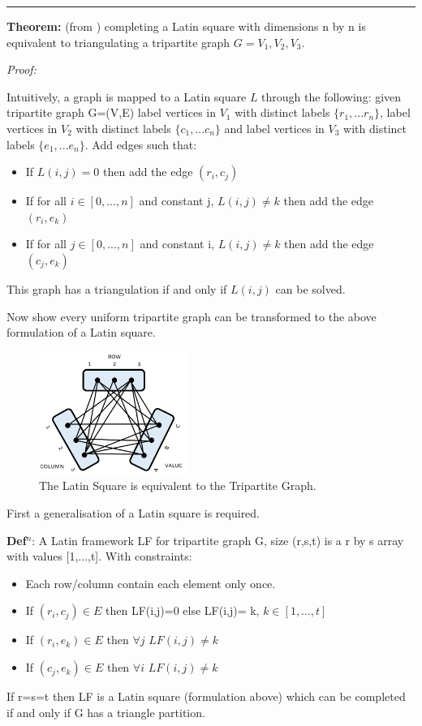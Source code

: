 \documentclass[a4paper,11pt]{report}
\newcounter{row}
\newcounter{col}
\newcounter{rowb}
\newcounter{colb}
\newcommand\setrowb[3]{
\setcounter{colb}{1}
\foreach \n in {#1, #2, #3} {
\edef\x{\value{colb} - 0.5}
\edef\y{3.5 - \value{rowb}}
\node[anchor=center] at (\x, \y) {\n};
\stepcounter{colb}
}
\stepcounter{rowb}
}
\begin{document}
\noindent\rule{4cm}{0.4pt}

\textbf{Theorem:} (from \cite{lsttg}) completing a Latin square with dimensions n by n is equivalent to triangulating a tripartite graph $G= V_1, V_2, V_3$.

\textit{Proof:} 

Intuitively, a graph is mapped to a Latin square $L$ through the following: 
given tripartite graph G=(V,E) label vertices in $V_1$ with distinct labels $\{r_1,...r_n\}$, label vertices in $V_2$ with distinct labels $\{c_1,...c_n\}$ and label vertices in $V_3$ with distinct labels $\{e_1,...e_n\}$. Add edges such that:
\begin{itemize}
\item{If $L(i,j) = 0$ then add the edge $(r_i,c_j)$ }
\item{If for all $i \in [0,...,n]$ and constant j, $L(i,j) \neq k$ then add the edge $(r_i,e_k)$}
\item{If for all $j \in [0,...,n]$ and constant i, $L(i,j) \neq k$ then add the edge $(c_j,e_k)$}
\end{itemize}
This graph has a triangulation if and only if $L(i,j)$ can be solved.

Now show every uniform tripartite graph can be transformed to the above formulation of a Latin square.

\begin{figure}[h!]
\centering
{}

\includegraphics[height=40mm]{figures/ttg.png}
\caption{The Latin Square is equivalent to the Tripartite Graph.}
\end{figure}

First a generalisation of a Latin square is required.

\textbf{Def$^n$}: A Latin framework LF for tripartite graph G, size (r,s,t) is a r by s array with values [1,...,t]. With constraints:
\begin{itemize}
\item{Each row/column contain each element only once.}
\item{If $(r_i,c_j)\in E$ then LF(i,j)=0 else LF(i,j)= k, $k\in [1,...,t]$}
\item{If $(r_i,e_k)\in E$ then $\forall j$ $LF(i,j)\neq k$}
\item{If $(c_j,e_k)\in E$ then $\forall i$ $LF(i,j)\neq k$}
\end{itemize}
If r=s=t then LF is a Latin square (formulation above) which can be completed if and only if G has a triangle partition.
\end{document}
